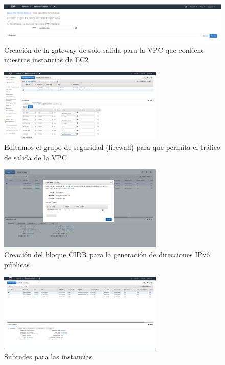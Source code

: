 \documentclass[9pt]{article}
\begin{document}
\begin{figure}[H]
  \centering
  \includegraphics[width=0.8\linewidth]{egress_only_gateway}
  \caption{Creación de la gateway de solo salida para la VPC que contiene nuestras instancias de EC2}
\end{figure}
\begin{figure}[H]
  \centering
  \includegraphics[width=0.7\textwidth]{edit_security_group}
  \caption{Editamos el grupo de seguridad (firewall) para que permita el tráfico  de salida de la VPC}
\end{figure}

\begin{figure}[H]
  \centering
  \includegraphics[width=0.7\textwidth]{ipv6_cidr}
  \caption{Creación del bloque CIDR para la generación de direcciones IPv6 públicas}
\end{figure}

\begin{figure}[H]
  \centering
  \includegraphics[width=0.7\textwidth]{subnets}
  \caption{Subredes para las instancias}
\end{figure}
\end{document}
